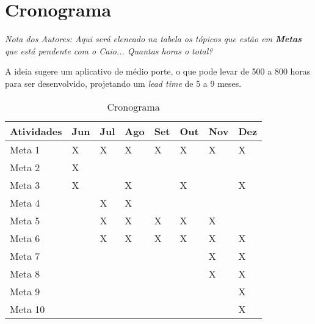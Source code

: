 \chapter[Cronograma]{Cronograma}

\emph{Nota dos Autores: Aqui será elencado na tabela os tópicos que estão em \textbf{Metas} que está pendente com o Caio... Quantas horas o total?}


A ideia sugere um aplicativo de médio porte, o que pode levar de 500 a 800 horas para ser desenvolvido, projetando um \textit{lead time} de 5 a 9 meses.



\begin{table}[htb]
  \centering
  \caption[Cronograma]{Cronograma}
  \label{tabCrono}
  \begin{tabular}{llllllll}
    \textbf{Atividades} & \textbf{Jun} & \textbf{Jul} & \textbf{Ago} & \textbf{Set} & \textbf{Out} & \textbf{Nov} & \textbf{Dez} \\
    \hline
    Meta 1          & X   & X   & X   & X   & X   & X   & X   \\
    Meta 2  		& X   &     &     &     &     &     &     \\
    Meta 3      	& X   &     & X   &     & X   &     & X   \\
    Meta 4 	        &     & X   & X   &     &     &     &     \\
    Meta 5 	        &     & X   & X   & X   & X   & X   &     \\
    Meta 6 			&     & X   & X   & X   & X   & X   & X   \\
    Meta 7 			&     &     &     &     &     & X   & X   \\
    Meta 8 			&     &     &     &     &     & X   & X   \\
    Meta 9 			&     &     &     &     &     &     & X   \\
    Meta 10 		&     &     &     &     &     &     & X   \\
    \hline
  \end{tabular}
\end{table}








